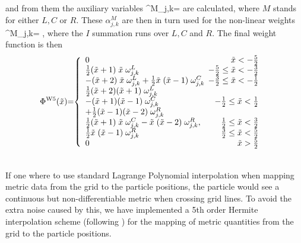 \documentclass[useAMS,usenatbib]{iopart}
\begin{document}
\eea
and from them  the auxiliary variables 
\be
\alpha^M_{j,k}= 
\ee
are calculated, where $M$ stands for either $L,C$ or $R$. These $\alpha^M_{j,k}$ are then in turn used
for the non-linear weights
\be
\omega^M_{j,k}= ,
\ee
where the $I$ summation runs over $L,C$ and $R$. The final weight function is then
 \[
   \hspace*{-0.2cm} \Phi^{\rm W5}(\tilde{x})  \hspace*{-0.1cm} =  \hspace*{-0.1cm} \left\{\begin{array}{lr}
        0 &  \hspace*{-0.2cm} \xt <  -\frac{5}{2}\\
        \frac{1}{2}(\xt + 1)\; \xt \; \omega^L_{j,k} &  \hspace*{-0.2cm} -\frac{5}{2} \leq \xt <-\frac{3}{2}\\
        -(\xt+2) \; \xt \; \omega^L_{j,k} + \frac{1}{2}\xt \; (\xt -1) \; \omega^C_{j,k}&  \hspace*{-0.2cm} -\frac{3}{2}\leq \xt < -\frac{1}{2}\\
         \frac{1}{2}(\xt+2) (\xt+1) \;  \omega^L_{j,k} \\
	 -(\xt+1) (\xt-1)\; \omega^C_{j,k} &  -\frac{1}{2}\leq \xt < \frac{1}{2}\\
	 +\frac{1}{2}(\xt -1)(\xt-2) \;  \omega^R_{j,k} \\
        \frac{1}{2}(\xt+1)\; \xt\; \omega^C_{j,k} -\xt\; (\xt-2)\; \omega^R_{j,k} ,&\hspace*{-0.5cm}  \frac{1}{2}\leq \xt < \frac{3}{2}\\
         \frac{1}{2}\xt \; (\xt-1) \; \omega^R_{j,k} &\hspace*{-0.2cm}  \frac{3}{2}\leq \xt < \frac{5}{2}\\
         0 &  \hspace*{-0.2cm} \xt > \frac{5}{2}  \\
         \end{array}\right. \\
  \]


\\
If one where to use standard Lagrange Polynomial interpolation when
mapping metric data from the grid to the particle positions, the particle
would see a continuous but non-differentiable metric when crossing grid
lines. To avoid the extra noise caused by this, we have implemented a
5th order Hermite interpolation scheme (following \cite{timmes00a}) for the
mapping of metric quantities from the grid to the particle positions.
\end{document}
